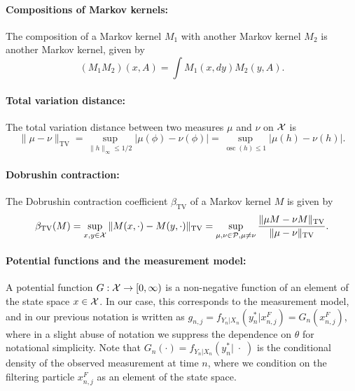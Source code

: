 \paragraph{Compositions of Markov kernels:} The composition of a Markov kernel $M_1$ with another Markov kernel $M_2$ is another Markov kernel, given by 
\begin{equation}
 (M_1M_2)(x, A) = \int M_1(x, dy) M_2(y, A).
\end{equation}

\paragraph{Total variation distance:} The total variation distance between two measures $\mu$ and $\nu$ on ${\mathcal{X}}$ is
\begin{equation}
\|\mu-\nu\|_{\mathrm{TV}}=\sup _{\|h\|_{\infty} \leq 1 / 2}|\mu(\phi)-\nu(\phi)|=\sup _{\operatorname{osc}(h) \leq 1}|\mu(h)-\nu(h)|.    
\end{equation}

\paragraph{Dobrushin contraction:} The Dobrushin contraction coefficient $\beta_{\text{TV}}$ of a Markov kernel $M$ is given by
\begin{equation}
\beta_{\mathrm{TV}}(M)=\sup _{x, y \in {\mathcal{X}}}\|M(x, \cdot)-M(y, \cdot)\|_{\mathrm{TV}}=\sup _{\mu, \nu \in \mathcal{P}, \mu \neq \nu} \frac{\|\mu M-\nu M\|_{\mathrm{TV}}}{\|\mu-\nu\|_{\mathrm{TV}}}.    
\end{equation}

\paragraph{Potential functions and the measurement model:} A potential function $G : {\mathcal{X}} \to [0,\infty)$ is a non-negative function of an element of the state space $x \in {\mathcal{X}}$. In our case, this corresponds to the measurement model, and in our previous notation is written as $g_{n,j} = f_{Y_n|X_n}(y_n^*|x_{n,j}^F) = G_n(x_{n,j}^F)$, where in a slight abuse of notation we suppress the dependence on $\theta$ for notational simplicity. Note that $G_n(\cdot) = f_{Y_n|X_n}(y_n^*|\;\cdot\;)$ is the conditional density of the observed measurement at time $n$, where we condition on the filtering particle $x_{n,j}^F$ as an element of the state space. 

